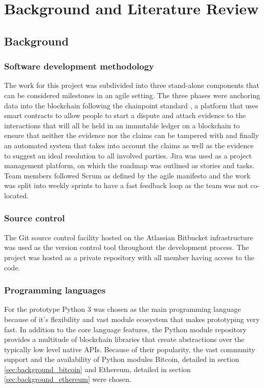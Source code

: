 \documentclass[12pt,msc,a4paper,oneside]{ucl_thesis}
\begin{document}
\chapter{Background and Literature Review}
\label{sec:bg_lit_review}

\section{Background}
\subsection{Software development methodology}
The work for this project was subdivided into three stand-alone components that can be considered milestones in an agile setting. The three phases were anchoring data into the blockchain following the chainpoint standard \cite{chainpoint:vaughan}, a platform that uses smart contracts to allow people to start a dispute and attach evidence to the interactions that will all be held in an immutable ledger on a blockchain to ensure that neither the evidence nor the claims can be tampered with and finally an automated system that takes into account the claims as well as the evidence to suggest an ideal resolution to all involved parties. %
Jira was used as a project management platform, on which the roadmap was outlined as stories and tasks. Team members followed Scrum as defined by the agile manifesto and the work was split into weekly sprints to have a fast feedback loop as the team was not co-located. 

\subsection{Source control}
The Git source control facility hosted on the Atlassian Bitbucket infrastructure was used as the version control tool throughout the development process. The project was hosted as a private repository with all member having access to the code. 

\subsection{Programming languages}
For the prototype Python 3 was chosen as the main programming language because of it's flexibility and vast module ecosystem that makes prototyping very fast. In addition to the core language features, the Python module repository provides a multitude of blockchain libraries that create abstractions over the typically low level native APIs. Because of their popularity, the vast community support and the availability of Python modules Bitcoin, detailed in section \ref{sec:background_bitcoin} and Ethereum, detailed in section \ref{sec:background_ethereum} were chosen. 
\end{document}
